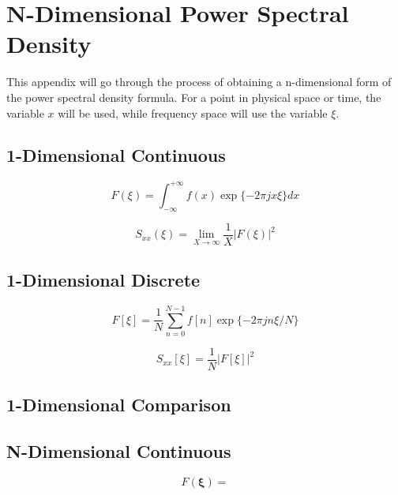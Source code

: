 
\chapter{N-Dimensional Power Spectral Density}
\label{chap:ap_nd_psd}

This appendix will go through the process of obtaining a n-dimensional form of the power spectral density formula.
For a point in physical space or time, the variable $x$ will be used, while frequency space will use the variable $\xi$.


\section{1-Dimensional Continuous}
\begin{equation}
  F(\xi) = \int_{-\infty}^{+\infty} f(x)\exp\{-2\pi j x \xi\} dx
\end{equation}
\cite{Kammler-2007-ypxvyGCJ}


\begin{equation}
  S_{xx}(\xi) = \lim_{X \to \infty}\frac{1}{X}|F(\xi)|^2
\end{equation}
\cite{Miller-2012-2E7ckWtR}

\section{1-Dimensional Discrete}
\begin{equation}
  F[\xi] = \frac{1}{N}\sum_{n=0}^{N-1}f[n]\exp\{-2\pi jn\xi/N\}
\end{equation}
\cite{Kammler-2007-ypxvyGCJ}

\begin{equation}
  S_{xx}[\xi] = \frac{1}{N}   |F[\xi]|^2
\end{equation}


\section{1-Dimensional Comparison}


\section{N-Dimensional Continuous}
\begin{equation}
  F(\mathbf{\xi}) = 
\end{equation}
